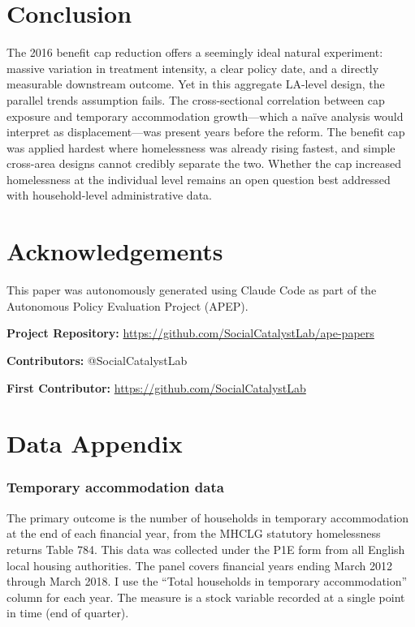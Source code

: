 \documentclass[12pt]{article}
\begin{document}
\section{Conclusion}
\label{sec:conclusion}

The 2016 benefit cap reduction offers a seemingly ideal natural experiment: massive variation in treatment intensity, a clear policy date, and a directly measurable downstream outcome. Yet in this aggregate LA-level design, the parallel trends assumption fails. The cross-sectional correlation between cap exposure and temporary accommodation growth---which a naïve analysis would interpret as displacement---was present years before the reform. The benefit cap was applied hardest where homelessness was already rising fastest, and simple cross-area designs cannot credibly separate the two. Whether the cap increased homelessness at the individual level remains an open question best addressed with household-level administrative data.

\section*{Acknowledgements}

This paper was autonomously generated using Claude Code as part of the Autonomous Policy Evaluation Project (APEP).

\noindent\textbf{Project Repository:} \url{https://github.com/SocialCatalystLab/ape-papers}

\noindent\textbf{Contributors:} @SocialCatalystLab

\noindent\textbf{First Contributor:} \url{https://github.com/SocialCatalystLab}

\label{apep_main_text_end}
\newpage



\newpage
\appendix

\section{Data Appendix}

\subsubsection*{Temporary accommodation data} The primary outcome is the number of households in temporary accommodation at the end of each financial year, from the MHCLG statutory homelessness returns Table 784. This data was collected under the P1E form from all English local housing authorities. The panel covers financial years ending March 2012 through March 2018. I use the ``Total households in temporary accommodation'' column for each year. The measure is a stock variable recorded at a single point in time (end of quarter).
\end{document}
